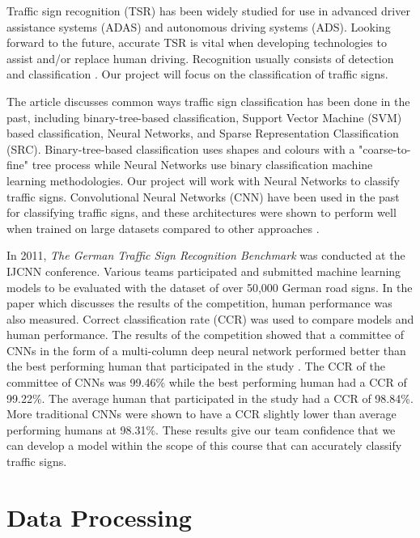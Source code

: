 \documentclass{article} %
\begin{document}
Traffic sign recognition (TSR) has been widely studied for use in advanced driver assistance systems (ADAS) and autonomous driving systems (ADS). Looking forward to the future, accurate TSR is vital when developing technologies to assist and/or replace human driving. Recognition usually consists of detection and classification \citep{Liu19}. Our project will focus on the classification of traffic signs.

The article \citet{Liu19} discusses common ways traffic sign classification has been done in the past, including binary-tree-based classification, Support Vector Machine (SVM) based classification, Neural Networks, and Sparse Representation Classification (SRC). Binary-tree-based classification uses shapes and colours with a "coarse-to-fine" tree process while Neural Networks use binary classification machine learning methodologies. Our project will work with Neural Networks to classify traffic signs. Convolutional Neural Networks (CNN) have been used in the past for classifying traffic signs, and these architectures were shown to perform well when trained on large datasets compared to other approaches \citep{Liu19}.

In 2011, \textit{The German Traffic Sign Recognition Benchmark} was conducted at the IJCNN conference. Various teams participated and submitted machine learning models to be evaluated with the dataset of over 50,000 German road signs. In the paper \citet{STALLKAMP2012323} which discusses the results of the competition, human performance was also measured. Correct classification rate (CCR) was used to compare models and human performance. The results of the competition showed that a committee of CNNs in the form of a multi-column deep neural network performed better than the best performing human that participated in the study \citep{STALLKAMP2012323}. The CCR of the committee of CNNs was 99.46\% while the best performing human had a CCR of 99.22\%. The average human that participated in the study had a CCR of 98.84\%. More traditional CNNs were shown to have a CCR slightly lower than average performing humans at 98.31\%. These results give our team confidence that we can develop a model within the scope of this course that can accurately classify traffic signs.

\section{Data Processing}
\end{document}

